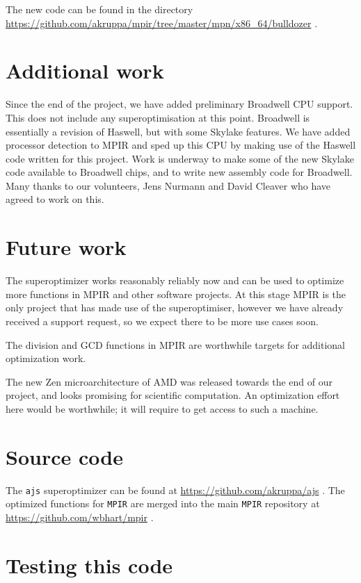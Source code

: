 The new code can be found in the directory
\url{https://github.com/akruppa/mpir/tree/master/mpn/x86_64/bulldozer} .

\section*{Additional work}\label{additional-work}

Since the end of the project, we have added preliminary Broadwell CPU
support. This does not include any superoptimisation at this point.
Broadwell is essentially a revision of Haswell, but with some Skylake
features. We have added processor detection to MPIR and sped up this CPU
by making use of the Haswell code written for this project. Work is
underway to make some of the new Skylake code available to Broadwell
chips, and to write new assembly code for Broadwell. Many thanks to our
volunteers, Jens Nurmann and David Cleaver who have agreed to work on
this.

\section*{Future work}\label{future-work}

The superoptimizer works reasonably reliably now and can be used to
optimize more functions in MPIR and other software projects. At this
stage MPIR is the only project that has made use of the superoptimiser,
however we have already received a support request, so we expect there
to be more use cases soon.

The division and GCD functions in MPIR are worthwhile targets for
additional optimization work.

The new Zen microarchitecture of AMD was released towards the end of our
project, and looks promising for scientific computation. An optimization
effort here would be worthwhile; it will require to get access to such a
machine.

\section*{Source code}\label{source-code}

The \texttt{ajs} superoptimizer can be found at
\url{https://github.com/akruppa/ajs} . The optimized functions for
\texttt{MPIR} are merged into the main \texttt{MPIR} repository at
\url{https://github.com/wbhart/mpir} .

\section*{Testing this code}\label{testing-this-code}

